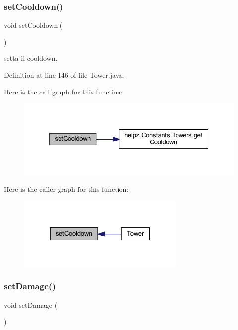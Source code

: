 \subsubsection{\texorpdfstring{set\+Cooldown()}{setCooldown()}}
{\footnotesize\ttfamily void set\+Cooldown (\begin{DoxyParamCaption}{ }\end{DoxyParamCaption})\hspace{0.3cm}{\ttfamily [private]}}



setta il cooldown. 



Definition at line 146 of file Tower.\+java.

Here is the call graph for this function\+:\nopagebreak
\begin{figure}[H]
\begin{center}
\leavevmode
\includegraphics[width=325pt]{classtowers_1_1_tower_a120aaa641fb05cbcbe27057048519fa7_cgraph}
\end{center}
\end{figure}
Here is the caller graph for this function\+:\nopagebreak
\begin{figure}[H]
\begin{center}
\leavevmode
\includegraphics[width=230pt]{classtowers_1_1_tower_a120aaa641fb05cbcbe27057048519fa7_icgraph}
\end{center}
\end{figure}
\mbox{\label{classtowers_1_1_tower_a342d428cb4c655ed4d92a2c5be287e5d}} 
\subsubsection{\texorpdfstring{set\+Damage()}{setDamage()}}
{\footnotesize\ttfamily void set\+Damage (\begin{DoxyParamCaption}{ }\end{DoxyParamCaption})\hspace{0.3cm}{\ttfamily [private]}}



